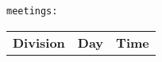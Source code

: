 \begin{center}
    \texttt{meetings:}
    \begin{tabular}{ l l l }
        \textbf{Division} & \textbf{Day} & \textbf{Time}
    \end{tabular}
\end{center}
